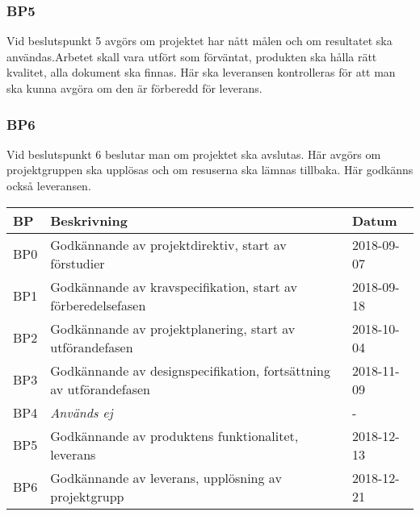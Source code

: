 \documentclass[projektplan/plan.tex]{subfiles}
\begin{document}
\subsubsection*{BP5}
Vid beslutspunkt 5 avgörs om projektet har nått målen och om resultatet ska
användas.Arbetet skall vara utfört som förväntat, produkten ska hålla rätt
kvalitet, alla dokument ska finnas. Här ska leveransen kontrolleras för att man
ska kunna avgöra om den är förberedd för leverans.

\subsubsection*{BP6}
Vid beslutspunkt 6 beslutar man om projektet ska avslutas. Här avgörs om
projektgruppen ska upplösas och om resuserna ska lämnas tillbaka. Här godkänns
också leveransen.

{\renewcommand{\arraystretch}{1.6}
\begin{longtable}{p{8mm}p{123mm}p{20mm}}
    \bfseries BP &
    \bfseries Beskrivning &
    \bfseries Datum \\\hline\endhead
    BP0 & Godkännande av projektdirektiv, start av förstudier & 2018-09-07 \\
    BP1 & Godkännande av kravspecifikation, start av förberedelsefasen &
    2018-09-18 \\
    BP2 & Godkännande av projektplanering, start av utförandefasen & 2018-10-04
    \\
    BP3 & Godkännande av designspecifikation, fortsättning av utförandefasen &
    2018-11-09 \\
    BP4 & \emph{Används ej} & -\\
    BP5 & Godkännande av produktens funktionalitet, leverans & 2018-12-13 \\
    BP6 & Godkännande av leverans, upplösning av projektgrupp & 2018-12-21 \\
\end{longtable}}

\newpage
\end{document}
